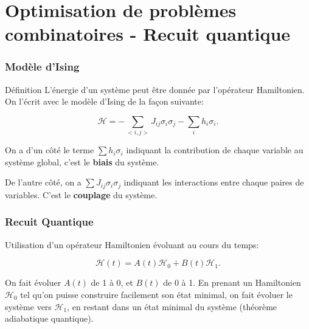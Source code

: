 \documentclass{beamer}
\begin{document}
\section[Recuit quantique]{Optimisation de problèmes combinatoires - Recuit quantique}

\begin{frame}
    \frametitle{Modèle d'Ising}

    \begin{block}{Définition}
        L'énergie d'un système peut être donnée par l'opérateur Hamiltonien. On l'écrit avec le modèle d'Ising de la façon suivante:

        \begin{equation}
            \mathcal{H} = -\displaystyle\sum_{<i, j>} J_{ij} \sigma_i \sigma_j - \displaystyle\sum_{i} h_i \sigma_i .
        \end{equation}

        On a d'un côté le terme $\displaystyle\sum h_i \sigma_i$ indiquant la contribution de chaque variable au système global, c'est le \textbf{biais} du système.

        \hspace{10cm}

        De l'autre côté, on a $\displaystyle\sum J_{ij} \sigma_i \sigma_j$ indiquant les interactions entre chaque paires de variables. C'est le \textbf{couplage} du système.
    \end{block}
\end{frame}

\begin{frame}
    \frametitle{Recuit Quantique}

    Utilisation d'un opérateur Hamiltonien évoluant au cours du temps:

    \begin{equation}
        \mathcal{H}(t) = A(t) \mathcal{H}_0 + B(t) \mathcal{H}_1.
    \end{equation}

    On fait évoluer $A(t)$ de 1 à 0, et $B(t)$ de 0 à 1.
\medbreak
    En prenant un Hamiltonien $\mathcal{H}_0$ tel qu'on puisse construire facilement son état minimal, on fait évoluer le système vers $\mathcal{H}_1$, en restant dans un état minimal du système (théorème adiabatique quantique).

\end{frame}
\end{document}
